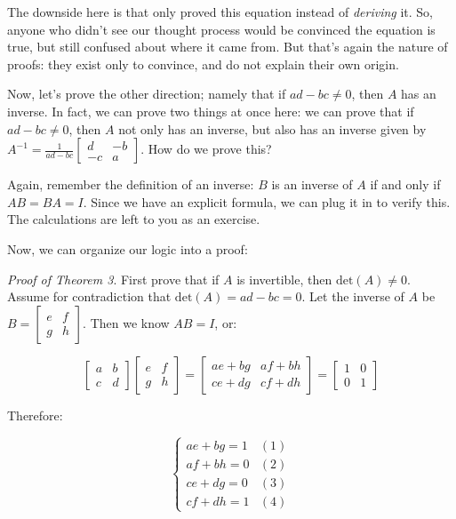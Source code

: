 \documentclass[11pt]{article}
\begin{document}
    The downside here is that only proved this equation instead of \textit{deriving} it.
    So, anyone who didn't see our thought process would be convinced the equation is true,
    but still confused about where it came from. But that's again the nature of proofs:
    they exist only to convince, and do not explain their own origin.
    
    Now, let's prove the other direction; namely that if $ad-bc\neq0$, then $A$ has an
    inverse. In fact, we can prove two things at once here: we can prove that if
    $ad-bc\neq0$, then $A$ not only has an inverse, but also has an inverse given by
    $A^{-1}=\frac1{ad-bc}\begin{bmatrix}d & -b \\ -c & a\end{bmatrix}$. How do we prove 
    this?
    
    Again, remember the definition of an inverse: $B$ is an inverse of $A$ if and only if
    $AB=BA=I$. Since we have an explicit formula, we can plug it in to verify this.
    The calculations are left to you as an exercise.
    
    Now, we can organize our logic into a proof:
    
    \textit{Proof of Theorem 3}. First prove that if $A$ is invertible, then
    $\mathrm{det}(A)\neq0$. Assume for contradiction that $\mathrm{det}(A)=ad-bc=0$.
    Let the inverse of $A$ be $B=\begin{bmatrix}e & f \\ g & h\end{bmatrix}$. Then
    we know $AB=I$, or:
    
    $$\begin{bmatrix}a & b \\ c & d\end{bmatrix}\begin{bmatrix}e & f \\ g & h\end{bmatrix}
    =\begin{bmatrix}ae+bg & af+bh \\ ce+dg & cf+dh\end{bmatrix}
    =\begin{bmatrix}1 & 0 \\ 0 & 1\end{bmatrix}$$
    
    Therefore:
    
    $$\begin{cases}
    ae+bg=1 & (1) \\
    af+bh=0 & (2) \\
    ce+dg=0 & (3) \\
    cf+dh=1 & (4)
    \end{cases}$$
    
\end{document}
